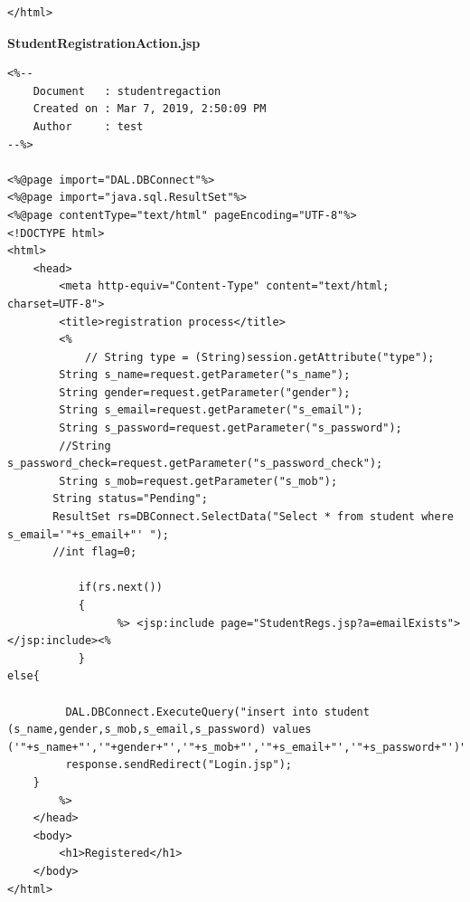 \begin{lstlisting}
</html>

\end{lstlisting}

{\bf StudentRegistrationAction.jsp}
\begin{lstlisting}
<%-- 
    Document   : studentregaction
    Created on : Mar 7, 2019, 2:50:09 PM
    Author     : test
--%>

<%@page import="DAL.DBConnect"%>
<%@page import="java.sql.ResultSet"%>
<%@page contentType="text/html" pageEncoding="UTF-8"%>
<!DOCTYPE html>
<html>
    <head>
        <meta http-equiv="Content-Type" content="text/html; charset=UTF-8">
        <title>registration process</title>
        <%
            // String type = (String)session.getAttribute("type");
        String s_name=request.getParameter("s_name");
        String gender=request.getParameter("gender");
        String s_email=request.getParameter("s_email");
        String s_password=request.getParameter("s_password");
        //String s_password_check=request.getParameter("s_password_check");
        String s_mob=request.getParameter("s_mob");
       String status="Pending";
       ResultSet rs=DBConnect.SelectData("Select * from student where s_email='"+s_email+"' ");
       //int flag=0;
       
           if(rs.next())
           {
                 %> <jsp:include page="StudentRegs.jsp?a=emailExists"></jsp:include><%
           }
else{
       
         DAL.DBConnect.ExecuteQuery("insert into student (s_name,gender,s_mob,s_email,s_password) values ('"+s_name+"','"+gender+"','"+s_mob+"','"+s_email+"','"+s_password+"')");
         response.sendRedirect("Login.jsp");
	} 
        %>
    </head>
    <body>
        <h1>Registered</h1>
    </body>
</html>

\end{lstlisting}

